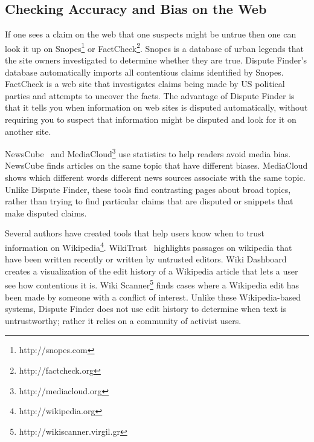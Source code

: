 \documentclass{www2010-submission}
\newcommand{\todo}[1]{}
\begin{document}
\subsection{Checking Accuracy and Bias on the Web}

If one sees a claim on the web that one suspects might be untrue then one can look it up on Snopes\footnote{http://snopes.com} or FactCheck\footnote{http://factcheck.org}. Snopes is a database of urban legends that the site owners investigated to determine whether they are true. 
Dispute Finder's database automatically imports all contentious claims identified by Snopes.
FactCheck is a web site that investigates claims being made by US political parties and attempts to uncover the facts. The advantage of Dispute Finder is that it tells you when information on web sites is disputed automatically, without requiring you to suspect that information might be disputed and look for it on another site.



\todo{Make sure we stay in sync}

NewsCube~\cite{Park2009} and MediaCloud\footnote{http://mediacloud.org} use statistics to help readers avoid media bias. NewsCube finds articles on the same topic that have different biases. MediaCloud shows which different words different news sources associate with the same topic. Unlike Dispute Finder, these tools find contrasting pages about broad topics, rather than trying to find particular claims that are disputed or snippets that make disputed claims.

Several authors have created tools that help users know when to trust information on Wikipedia\footnote{http://wikipedia.org}. WikiTrust~\cite{Adler2008a} highlights passages on wikipedia that have been written recently or written by untrusted editors. Wiki Dashboard~\cite{Kittur2008} creates a visualization of the edit history of a Wikipedia article that lets a user see how contentious it is. Wiki Scanner\footnote{http://wikiscanner.virgil.gr} finds cases where a Wikipedia edit has been made by someone with a conflict of interest. Unlike these Wikipedia-based systems, Dispute Finder does not use edit history to determine when text is untrustworthy; rather it relies on a community of activist users.

% 
% 
\end{document}
